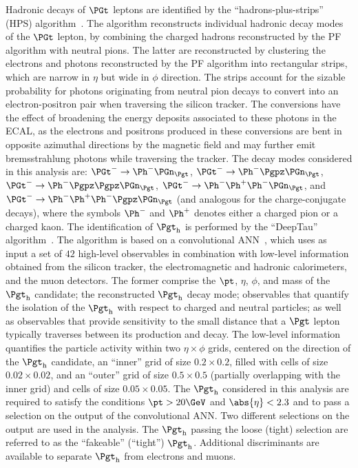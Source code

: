 Hadronic decays of $\PGt$ leptons are identified by the ``hadrons-plus-strips'' (HPS) algorithm~\cite{Sirunyan:2018pgf}.
The algorithm reconstructs individual hadronic decay modes of the $\PGt$ lepton,
by combining the charged hadrons reconstructed by the PF algorithm with neutral pions.
The latter are reconstructed by clustering the electrons and photons reconstructed by the PF algorithm into rectangular strips,
which are narrow in $\eta$ but wide in $\phi$ direction.
The strips account for the sizable probability for photons originating from neutral pion decays
to convert into an electron-positron pair when traversing the silicon tracker.
The conversions have the effect of broadening the energy deposits associated to these photons in the ECAL,
as the electrons and positrons produced in these conversions are bent in opposite azimuthal directions by the magnetic field
and may further emit bremsstrahlung photons while traversing the tracker.
The decay modes considered in this analysis are:
$\PGt^{-} \to \Ph^{-}\Pnut$, $\PGt^{-} \to \Ph^{-}\Ppizero\Pnut$, $\PGt^{-} \to \Ph^{-}\Ppizero\Ppizero\Pnut$, 
$\PGt^{-} \to \Ph^{-}\Ph^{+}\Ph^{-}\Pnut$, and $\PGt^{-} \to \Ph^{-}\Ph^{+}\Ph^{-}\Ppizero\Pnut$
(and analogous for the charge-conjugate decays),
where the symbols $\Ph^{-}$ and $\Ph^{+}$ denotes either a charged pion or a charged kaon.
The identification of $\tauh$ is performed by the ``DeepTau'' algorithm~\cite{CMS-DP-2019-033}.
The algorithm is based on a convolutional ANN~\cite{lecun1989},
which uses as input a set of $42$ high-level observables in combination with low-level information obtained from the silicon tracker, the electromagnetic and hadronic calorimeters, and the muon detectors.
The former comprise the $\pt$, $\eta$, $\phi$, and mass of the $\tauh$ candidate; the reconstructed $\tauh$ decay mode;
observables that quantify the isolation of the $\tauh$ with respect to charged and neutral particles;
as well as observables that provide sensitivity to the small distance that a $\Pgt$ lepton typically traverses between its production and decay.
The low-level information quantifies the particle activity within two $\eta \times \phi$ grids, centered on the direction of the $\tauh$ candidate,
an ``inner'' grid of size $0.2 \times 0.2$, filled with cells of size $0.02 \times 0.02$,
and an ``outer'' grid of size $0.5 \times 0.5$ (partially overlapping with the inner grid) and cells of size $0.05 \times 0.05$.
The $\tauh$ considered in this analysis are required to satisfy the conditions $\pt > 20\GeV$ and $\abs{\eta} < 2.3$ 
and to pass a selection on the output of the convolutional ANN.
Two different selections on the output are used in the analysis.
The $\tauh$ passing the loose (tight) selection are referred to as the ``fakeable'' (``tight'') $\tauh$.
Additional discriminants are available to separate $\tauh$ from electrons and muons.

